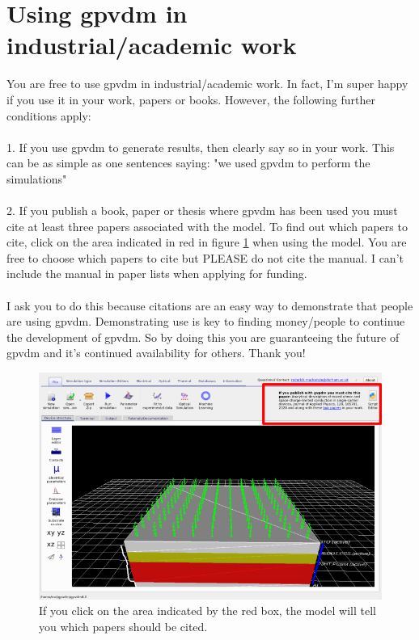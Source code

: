 \section{Using gpvdm in industrial/academic work}
\label{sec:using_gvpdm}
You are free to use gpvdm in industrial/academic work. In fact, I'm super happy if you use it in your work, papers or books. However, the following further conditions apply:\\\\
1. If you use gpvdm to generate results, then clearly say so in your work. This can be as simple as one sentences saying: "we used gpvdm to perform the simulations" \\\\
2. If you publish a book, paper or thesis where gpvdm has been used you must cite at least three papers associated with the model.  To find out which papers to cite, click on the area indicated in red in figure \ref{fig:cite_me} when using the model.   You are free to choose which papers to cite but PLEASE do not cite the manual. I can't include the manual in paper lists when applying for funding.\\
\\
I ask you to do this because citations are an easy way to demonstrate that people are using gpvdm. Demonstrating use is key to finding money/people to continue the development of gpvdm.  So by doing this you are guaranteeing the future of gpvdm and it's continued availability for others.  Thank you!

\begin{figure}[H]
\centering
\includegraphics[width=\textwidth]{./images/cite_me2.png}
\caption{If you click on the area indicated by the red box, the model will tell you which papers should be cited.}
\label{fig:cite_me}
\end{figure}
